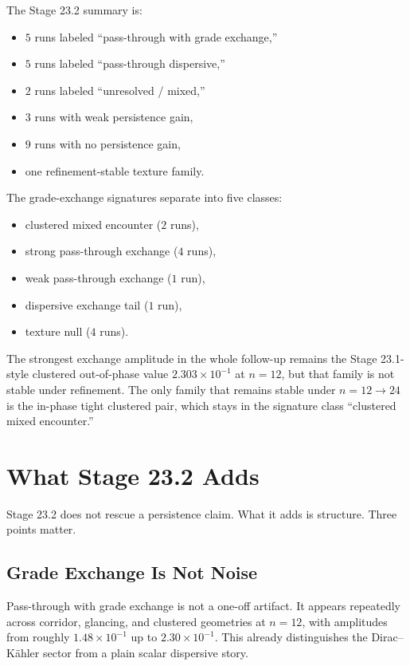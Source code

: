 \documentclass[11pt]{article}
\begin{document}
The Stage 23.2 summary is:
\begin{itemize}
\item $5$ runs labeled ``pass-through with grade exchange,''
\item $5$ runs labeled ``pass-through dispersive,''
\item $2$ runs labeled ``unresolved / mixed,''
\item $3$ runs with weak persistence gain,
\item $9$ runs with no persistence gain,
\item one refinement-stable texture family.
\end{itemize}

The grade-exchange signatures separate into five classes:
\begin{itemize}
\item clustered mixed encounter ($2$ runs),
\item strong pass-through exchange ($4$ runs),
\item weak pass-through exchange ($1$ run),
\item dispersive exchange tail ($1$ run),
\item texture null ($4$ runs).
\end{itemize}
The strongest exchange amplitude in the whole follow-up remains the Stage 23.1-style clustered out-of-phase value $2.303\times10^{-1}$ at $n=12$, but that family is not stable under refinement. The only family that remains stable under $n=12\rightarrow24$ is the in-phase tight clustered pair, which stays in the signature class ``clustered mixed encounter.''

\section{What Stage 23.2 Adds}

Stage 23.2 does not rescue a persistence claim. What it adds is structure. Three points matter.

\subsection{Grade Exchange Is Not Noise}

Pass-through with grade exchange is not a one-off artifact. It appears repeatedly across corridor, glancing, and clustered geometries at $n=12$, with amplitudes from roughly $1.48\times10^{-1}$ up to $2.30\times10^{-1}$. This already distinguishes the Dirac--K\"ahler sector from a plain scalar dispersive story.
\end{document}
